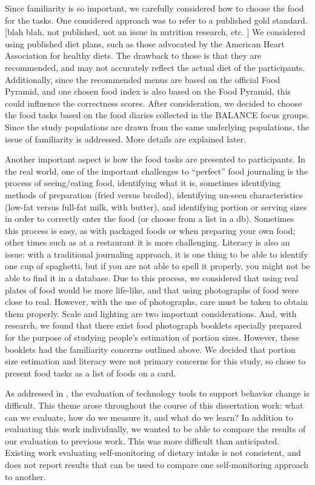 Since familiarity is so important, we carefully considered how to choose the food for the tasks. One considered approach was to refer to a published gold standard. [blah blah, not published, not an issue in nutrition research, etc. ] We considered using published diet plans, such as those advocated by the American Heart Association for healthy diets. The drawback to those is that they are recommended, and may not accurately reflect the actual diet of the participants. Additionally, since the recommended menus are based on the official Food Pyramid, and one chosen food index is also based on the Food Pyramid, this could influence the correctness scores. After consideration, we decided to choose the food tasks based on the food diaries collected in the BALANCE focus groups. Since the study populations are drawn from the same underlying populations, the issue of familiarity is addressed. More details are explained later. 

Another important aspect is how the food tasks are presented to participants. In the real world, one of the important challenges to ``perfect'' food journaling is the process of seeing/eating food, identifying what it is, sometimes identifying methods of preparation (fried versus broiled), identifying un-seen characteristics (low-fat versus full-fat milk, with butter), and identifying portion or serving sizes in order to correctly enter the food (or choose from a list in a db). Sometimes this process is easy, as with packaged foods or when preparing your own food; other times such as at a restaurant it is more challenging. Literacy is also an issue: with a traditional journaling approach, it is one thing to be able to identify one cup of spaghetti, but if you are not able to spell it properly, you might not be able to find it in a database. Due to this process, we considered that using real plates of food would be more life-like, and that using photographs of food were close to real. However, with the use of photographs, care must be taken to obtain them properly. Scale and lighting are two important considerations. And, with research, we found that there exist food photograph booklets specially prepared for the purpose of studying people's estimation of portion sizes. However, these booklets had the familiarity concerns outlined above. We decided that portion size estimation and literacy were not primary concerns for this study, so chose to present food tasks as a list of foods on a card. 

As addressed in \cite{klasnja_how_2011}, the evaluation of technology tools to support behavior change is difficult. This theme arose throughout the course of this dissertation work: what can we evaluate, how do we measure it, and what do we learn? In addition to evaluating this work individually, we wanted to be able to compare the results of our evaluation to previous work. This was more difficult than anticipated. Existing work evaluating self-monitoring of dietary intake is not consistent, and does not report results that can be used to compare one self-monitoring approach to another. 

